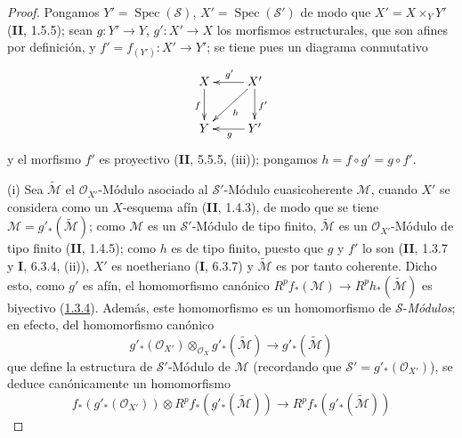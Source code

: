 \begin{proof}
Pongamos $Y'=\operatorname{Spec}(\mathcal S)$,
$X'=\operatorname{Spec}(\mathcal S')$ de modo que
$X'=X\times_Y Y'$ (\textbf{II}, 1.5.5); sean $g:Y'\to Y$,
$g':X'\to X$ los morfismos estructurales, que son afines por
definición, y $f'=f_{(Y')}:X'\to Y'$; se tiene pues un diagrama
conmutativo
\[
\xymatrix{
X\ar[d]_f & X'\ar[l]_{g'}\ar[d]^{f'}\ar[dl]^{h}\\
Y & Y'\ar[l]^{g}
}
\]
y el morfismo $f'$ es proyectivo (\textbf{II}, 5.5.5, (iii)); pongamos
$h=f\circ g'=g\circ f'$.

(i) Sea $\widetilde{\mathcal M}$ el $\mathcal O_{X'}$-Módulo asociado al
$\mathcal S'$-Módulo cuasicoherente $\mathcal M$, cuando $X'$ se
considera como un $X$-esquema afín (\textbf{II}, 1.4.3), de modo que se tiene
$\mathcal M=g'_*(\widetilde{\mathcal M})$; como $\mathcal M$ es un
$\mathcal S'$-Módulo de tipo finito, $\widetilde{\mathcal M}$ es un
$\mathcal O_{X'}$-Módulo de tipo finito (\textbf{II}, 1.4.5); como $h$ es de tipo
finito, puesto que $g$ y $f'$ lo son (\textbf{II}, 1.3.7 y \textbf{I}, 6.3.4, (ii)), $X'$ es
noetheriano (\textbf{I}, 6.3.7) y $\widetilde{\mathcal M}$ es por tanto coherente.
Dicho esto, como $g'$ es afín, el homomorfismo canónico
$R^pf_*(\mathcal M)\to R^ph_*(\widetilde{\mathcal M})$ es biyectivo
(\hyperref[III.1.3.4-fr]{1.3.4}). Además, este homomorfismo es un
homomorfismo de $\mathcal S$-\emph{Módulos}; en efecto, del homomorfismo
canónico
\[
g'_*(\mathcal O_{X'})\otimes_{\mathcal O_X}
g'_*(\widetilde{\mathcal M})\longrightarrow
g'_*(\widetilde{\mathcal M})
\tag{2.4.1.2}\label{III.2.4.1.2-fr}
\]
que define la estructura de $\mathcal S'$-Módulo de $\mathcal M$ (recordando
que $\mathcal S'=g'_*(\mathcal O_{X'})$), se deduce
canónicamente un homomorfismo
\[
f_*(g'_*(\mathcal O_{X'}))\otimes
R^pf_*(g'_*(\widetilde{\mathcal M}))\longrightarrow
R^pf_*(g'_*(\widetilde{\mathcal M}))
\]


\end{proof}
